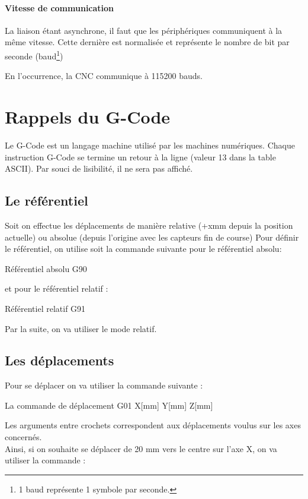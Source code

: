 {\subsubsection{Vitesse de communication}

La liaison étant asynchrone, il faut que les périphériques communiquent à la même vitesse. Cette dernière est normalisée et représente le nombre de bit par seconde (baud\footnote{1 baud représente 1 symbole par seconde.})

En l’occurrence, la CNC communique à 115200 bauds.


\chapter{Rappels du G-Code}

Le G-Code est un langage machine utilisé par les machines numériques.
Chaque instruction G-Code se termine un retour à la ligne (valeur 13 dans la table ASCII). Par souci de lisibilité, il ne sera pas affiché.
\section{Le référentiel}
Soit on effectue les déplacements de manière relative (+xmm depuis la position actuelle) ou absolue (depuis l'origine avec les capteurs fin de course)
Pour définir le référentiel, on utilise soit la commande suivante pour le référentiel absolu:

\begin{Cpp}{Référentiel absolu}
G90
\end{Cpp}
et pour le référentiel relatif : 
\begin{Cpp}{Référentiel relatif}
G91
\end{Cpp}

Par la suite, on va utiliser le mode relatif.

\section{Les déplacements}

Pour se déplacer on va utiliser la commande suivante : 

\begin{Cpp}{La commande de déplacement}
G01 X[mm] Y[mm] Z[mm]
\end{Cpp}

Les arguments entre crochets correspondent aux déplacements voulus sur les axes concernés.\\
Ainsi, si on souhaite se déplacer de 20 mm vers le centre sur l'axe X, on va utiliser la commande : 

}
